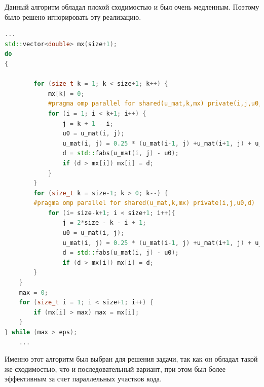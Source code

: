 \documentclass[12pt]{article}
\begin{document}
Данный алгоритм обладал плохой сходимостью и был очень медленным. Поэтому было решено игнорировать эту реализацию.	
	\begin{lstlisting}[language=c++,caption=реализация параллельного алгоритма,label=third:para]	
	...
std::vector<double> mx(size+1);
do
{
	
		for (size_t k = 1; k < size+1; k++) {
			mx[k] = 0;
			#pragma omp parallel for shared(u_mat,k,mx) private(i,j,u0,d)
			for (i = 1; i < k+1; i++) {
				j = k + 1 - i;
				u0 = u_mat(i, j);
				u_mat(i, j) = 0.25 * (u_mat(i-1, j) +u_mat(i+1, j) + u_mat(i, j-1) + u_mat(i, j+1) - h*h*f_mat(i-1, j-1));
				d = std::fabs(u_mat(i, j) - u0);
				if (d > mx[i]) mx[i] = d;
			}
		}
		for (size_t k = size-1; k > 0; k--) {
		#pragma omp parallel for shared(u_mat,k,mx) private(i,j,u0,d)
			for (i= size-k+1; i < size+1; i++){
				j = 2*size - k - i + 1;
				u0 = u_mat(i, j);
				u_mat(i, j) = 0.25 * (u_mat(i-1, j) +u_mat(i+1, j) + u_mat(i, j-1) + u_mat(i, j+1) - h*h*f_mat(i-1, j-1));
				d = std::fabs(u_mat(i, j) - u0);
				if (d > mx[i]) mx[i] = d;				
		}
	}
	max = 0;
	for (size_t i = 1; i < size+1; i++) {
		if (mx[i] > max) max = mx[i];
	}
} while (max > eps);
	...
	\end{lstlisting}
Именно этот алгоритм был выбран для решения задачи, так как он обладал такой же сходимостью, что и последовательный вариант, при этом был более эффективным за счет параллельных участков кода.
\end{document}
